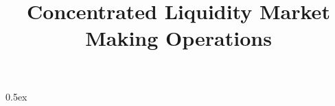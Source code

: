 \documentclass[11pt,a4paper]{article}
\begin{document}
\title{Concentrated Liquidity Market Making Operations}
\maketitle

\tableofcontents
\parindent 0pt\parskip 0.5ex


\end{document}
